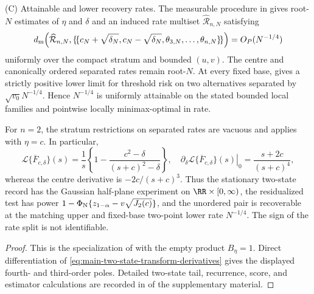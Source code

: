 \begin{theorem}
\smallskip\noindent\textup{(C) Attainable and lower recovery rates.}
The measurable procedure in 
gives root-\(N\) estimates of \(\eta\) and \(\delta\) and an induced rate
multiset \(\widehat{\mathcal R}_{n,N}\) satisfying
\begin{equation}
 d_{\rm m}\!\left(\widehat{\mathcal R}_{n,N},
 \{\!\{c_N+\sqrt{\delta_N},c_N-\sqrt{\delta_N},
 \theta_{3,N},\ldots,\theta_{n,N}\}\!\}\right)=O_P(N^{-1/4})
\label{eq:main-recovery-rate}
\end{equation}
uniformly over the compact stratum and bounded \((u,v)\).  The centre and
canonically ordered separated rates remain root-\(N\).  At every fixed base,
 gives a strictly positive lower
limit for threshold risk on two alternatives separated by
\(\sqrt{v_0}N^{-1/4}\).  Hence \(N^{-1/4}\) is uniformly attainable on the
stated bounded local families and pointwise locally minimax-optimal in rate.
\end{theorem}

\begin{corollary}
\label{cor:two-state-collision-main}
For \(n=2\), the stratum restrictions on separated rates are vacuous and
 applies with \(\eta=c\).  In
particular,
\begin{equation}
 \mathcal L\{\overline F_{c,\delta}\}(s)
 =\frac1s\left\{1-\frac{c^2-\delta}{(s+c)^2-\delta}\right\},
\quad
 \left.\partial_\delta\mathcal L\{\overline F_{c,\delta}\}(s)
 \right|_0=\frac{s+2c}{(s+c)^4},
\label{eq:main-two-state-transform-derivatives}
\end{equation}
whereas the centre derivative is \(-2c/(s+c)^3\).  Thus the stationary
two-state record has the Gaussian half-plane experiment on
\(\RR\times[0,\infty)\), the residualized test has power
\(1-\Phi_{\rm N}\{z_{1-\alpha}-v\sqrt{J_2(c)}\}\), and the unordered pair
is recoverable at the matching upper and fixed-base two-point lower rate
\(N^{-1/4}\).  The sign of the rate split is not identifiable.
\end{corollary}

\begin{proof}
This is the specialization of 
with the empty product \(B_\eta=1\).  Direct differentiation of
\eqref{eq:main-two-state-transform-derivatives} gives the displayed fourth- and third-order poles.  Detailed
two-state tail, recurrence, score, and estimator calculations are recorded in
 of the supplementary material.
\end{proof}

